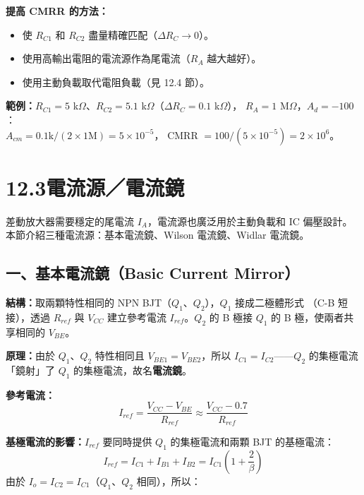 \documentclass[12pt]{article}
\begin{document}
\noindent\textbf{提高 CMRR 的方法：}
\begin{itemize}[leftmargin=2em,itemsep=2pt]
  \item 使 $R_{C1}$ 和 $R_{C2}$ 盡量精確匹配（$\Delta R_C \to 0$）。
  \item 使用高輸出電阻的電流源作為尾電流（$R_A$ 越大越好）。
  \item 使用主動負載取代電阻負載（見 12.4 節）。
\end{itemize}

\noindent\textbf{範例：}$R_{C1} = 5$ k$\Omega$、$R_{C2} = 5.1$ k$\Omega$（$\Delta R_C = 0.1$ k$\Omega$），
$R_A = 1$ M$\Omega$，$A_d = -100$：\\
$A_{cm} = 0.1\text{k}/(2 \times 1\text{M}) = 5\times10^{-5}$，
CMRR $= 100 / (5\times10^{-5}) = 2\times10^6$。

\section*{12.3\quad 電流源／電流鏡}

差動放大器需要穩定的尾電流 $I_A$，電流源也廣泛用於主動負載和 IC 偏壓設計。
本節介紹三種電流源：基本電流鏡、Wilson 電流鏡、Widlar 電流鏡。

\subsection*{一、基本電流鏡（Basic Current Mirror）}


\begin{keybox}[基本電流鏡的原理]
\textbf{結構：}取兩顆特性相同的 NPN BJT（$Q_1$、$Q_2$），$Q_1$ 接成二極體形式
（C-B 短接），透過 $R_{ref}$ 與 $V_{CC}$ 建立參考電流 $I_{ref}$。$Q_2$ 的 B 極接
$Q_1$ 的 B 極，使兩者共享相同的 $V_{BE}$。

\medskip
\textbf{原理：}由於 $Q_1$、$Q_2$ 特性相同且 $V_{BE1} = V_{BE2}$，所以
$I_{C1} = I_{C2}$——$Q_2$ 的集極電流「鏡射」了 $Q_1$ 的集極電流，故名\textbf{電流鏡}。

\medskip
\textbf{參考電流：}
\[
  I_{ref} = \frac{V_{CC} - V_{BE}}{R_{ref}} \approx \frac{V_{CC} - 0.7}{R_{ref}}
\]

\textbf{基極電流的影響：}$I_{ref}$ 要同時提供 $Q_1$ 的集極電流和兩顆 BJT 的基極電流：
\[
  I_{ref} = I_{C1} + I_{B1} + I_{B2} = I_{C1}\left(1 + \frac{2}{\beta}\right)
\]
由於 $I_o = I_{C2} = I_{C1}$（$Q_1$、$Q_2$ 相同），所以：
\end{keybox}
\end{document}
